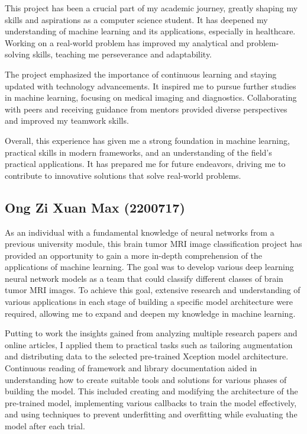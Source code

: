 This project has been a crucial part of my academic journey, greatly shaping my skills and aspirations as a computer science student. It has deepened my understanding of machine learning and its applications, especially in healthcare. Working on a real-world problem has improved my analytical and problem-solving skills, teaching me perseverance and adaptability.

The project emphasized the importance of continuous learning and staying updated with technology advancements. It inspired me to pursue further studies in machine learning, focusing on medical imaging and diagnostics. Collaborating with peers and receiving guidance from mentors provided diverse perspectives and improved my teamwork skills.

Overall, this experience has given me a strong foundation in machine learning, practical skills in modern frameworks, and an understanding of the field's practical applications. It has prepared me for future endeavors, driving me to contribute to innovative solutions that solve real-world problems.


\subsection{Ong Zi Xuan Max (2200717)}

As an individual with a fundamental knowledge of neural networks from a previous university module, this brain tumor MRI image classification project has provided an opportunity to gain a more in-depth comprehension of the applications of machine learning. The goal was to develop various deep learning neural network models as a team that could classify different classes of brain tumor MRI images. To achieve this goal, extensive research and understanding of various applications in each stage of building a specific model architecture were required, allowing me to expand and deepen my knowledge in machine learning.

Putting to work the insights gained from analyzing multiple research papers and online articles, I applied them to practical tasks such as tailoring augmentation and distributing data to the selected pre-trained Xception model architecture. Continuous reading of framework and library documentation aided in understanding how to create suitable tools and solutions for various phases of building the model. This included creating and modifying the architecture of the pre-trained model, implementing various callbacks to train the model effectively, and using techniques to prevent underfitting and overfitting while evaluating the model after each trial.

